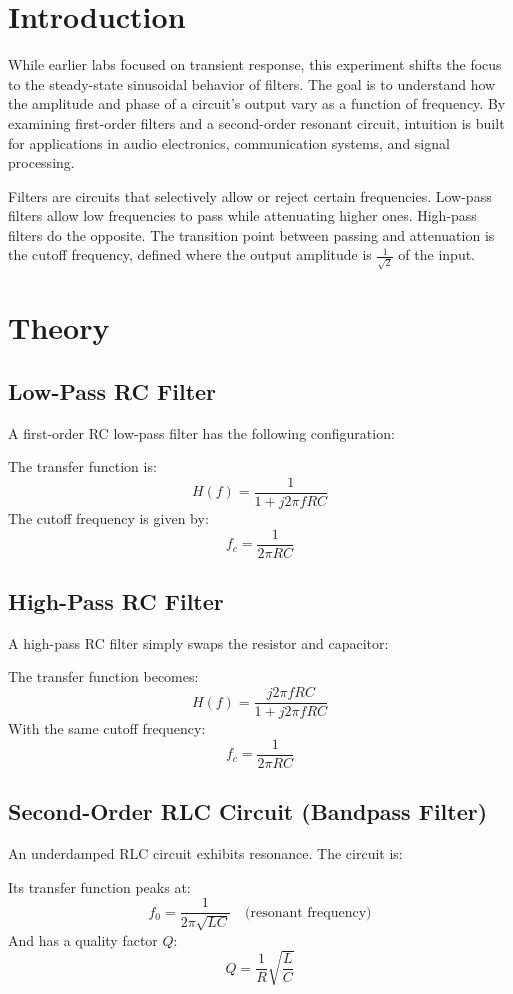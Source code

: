 \documentclass[12pt]{article}
\begin{document}
\newpage
\section{Introduction}
While earlier labs focused on transient response, this experiment shifts the focus to the steady-state sinusoidal behavior of filters. The goal is to understand how the amplitude and phase of a circuit’s output vary as a function of frequency. By examining first-order filters and a second-order resonant circuit, intuition is built for applications in audio electronics, communication systems, and signal processing.

Filters are circuits that selectively allow or reject certain frequencies. Low-pass filters allow low frequencies to pass while attenuating higher ones. High-pass filters do the opposite. The transition point between passing and attenuation is the cutoff frequency, defined where the output amplitude is $\frac{1}{\sqrt{2}}$ of the input.

\section{Theory}
\subsection{Low-Pass RC Filter}
A first-order RC low-pass filter has the following configuration:


The transfer function is:
\[
	H(f) = \frac{1}{1 + j2\pi fRC}
\]
The cutoff frequency is given by:
\[
	f_c = \frac{1}{2\pi RC}
\]

\subsection{High-Pass RC Filter}
A high-pass RC filter simply swaps the resistor and capacitor:


The transfer function becomes:
\[
	H(f) = \frac{j2\pi fRC}{1 + j2\pi fRC}
\]
With the same cutoff frequency:
\[
	f_c = \frac{1}{2\pi RC}
\]

\subsection{Second-Order RLC Circuit (Bandpass Filter)}
An underdamped RLC circuit exhibits resonance. The circuit is:


Its transfer function peaks at:
\[
	f_0 = \frac{1}{2\pi\sqrt{LC}} \quad \text{(resonant frequency)}
\]
And has a quality factor $Q$:
\[
	Q = \frac{1}{R} \sqrt{\frac{L}{C}}
\]
\end{document}
